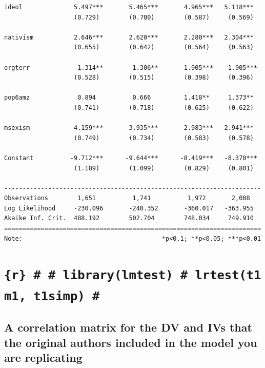 \documentclass[
  letterpaper,
  DIV=11,
  numbers=noendperiod]{scrartcl}
\begin{document}
\begin{verbatim}
ideol              5.497***       5.465***       4.965***   5.118***  
                   (0.729)        (0.700)        (0.587)     (0.569)  
                                                                      
nativism           2.646***       2.620***       2.280***   2.304***  
                   (0.655)        (0.642)        (0.564)     (0.563)  
                                                                      
orgterr            -1.314**       -1.306**      -1.905***   -1.905*** 
                   (0.528)        (0.515)        (0.398)     (0.396)  
                                                                      
pop6amz             0.894          0.666         1.418**     1.373**  
                   (0.741)        (0.718)        (0.625)     (0.622)  
                                                                      
msexism            4.159***       3.935***       2.983***   2.941***  
                   (0.749)        (0.734)        (0.583)     (0.578)  
                                                                      
Constant          -9.712***      -9.644***      -8.419***   -8.370*** 
                   (1.189)        (1.099)        (0.829)     (0.801)  
                                                                      
----------------------------------------------------------------------
Observations        1,651          1,741          1,972       2,008   
Log Likelihood     -230.096       -240.352       -360.017   -363.955  
Akaike Inf. Crit.  488.192        502.704        748.034     749.910  
======================================================================
Note:                                      *p<0.1; **p<0.05; ***p<0.01
\end{verbatim}

\section{\texorpdfstring{\texttt{\{r\}\ \#\ \#\ library(lmtest)\ \#\ lrtest(t1m1,\ t1simp)\ \#}}{\{r\} \# \# library(lmtest) \# lrtest(t1m1, t1simp) \#}}\label{r-librarylmtest-lrtestt1m1-t1simp}

\subsection{A correlation matrix for the DV and IVs that the original
authors included in the model you are
replicating}\label{a-correlation-matrix-for-the-dv-and-ivs-that-the-original-authors-included-in-the-model-you-are-replicating}
\end{document}
